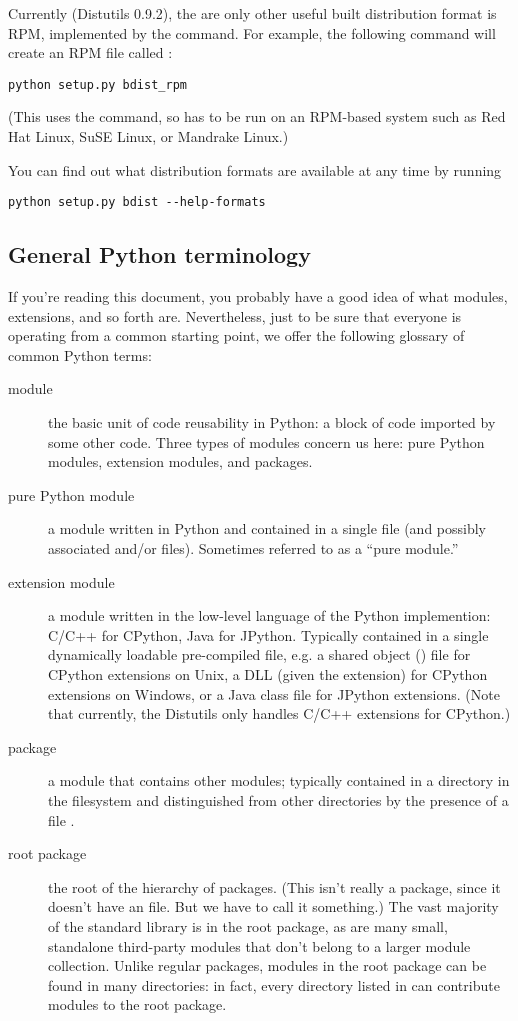 \documentclass{howto}
\begin{document}
Currently (Distutils 0.9.2), the are only other useful built
distribution format is RPM, implemented by the 
command.  For example, the following command will create an RPM file
called :
\begin{verbatim}
python setup.py bdist_rpm
\end{verbatim}
(This uses the  command, so has to be run on an RPM-based
system such as Red Hat Linux, SuSE Linux, or Mandrake Linux.)

You can find out what distribution formats are available at any time by
running
\begin{verbatim}
python setup.py bdist --help-formats
\end{verbatim}


\subsection{General Python terminology}
\label{python-terms}

If you're reading this document, you probably have a good idea of what
modules, extensions, and so forth are.  Nevertheless, just to be sure
that everyone is operating from a common starting point, we offer the
following glossary of common Python terms:
\begin{description}
\item[module] the basic unit of code reusability in Python: a block of
  code imported by some other code.  Three types of modules concern us
  here: pure Python modules, extension modules, and packages.
\item[pure Python module] a module written in Python and contained in a
  single  file (and possibly associated  and/or
   files).  Sometimes referred to as a ``pure module.''
\item[extension module] a module written in the low-level language of
  the Python implemention: C/C++ for CPython, Java for JPython.
  Typically contained in a single dynamically loadable pre-compiled
  file, e.g. a shared object () file for CPython extensions on
  Unix, a DLL (given the  extension) for CPython extensions
  on Windows, or a Java class file for JPython extensions.  (Note that
  currently, the Distutils only handles C/C++ extensions for CPython.)
\item[package] a module that contains other modules; typically contained
  in a directory in the filesystem and distinguished from other
  directories by the presence of a file .
\item[root package] the root of the hierarchy of packages.  (This isn't
  really a package, since it doesn't have an 
  file.  But we have to call it something.)  The vast majority of the
  standard library is in the root package, as are many small, standalone
  third-party modules that don't belong to a larger module collection.
  Unlike regular packages, modules in the root package can be found in
  many directories: in fact, every directory listed in 
  can contribute modules to the root package.
\end{description}
\end{document}
